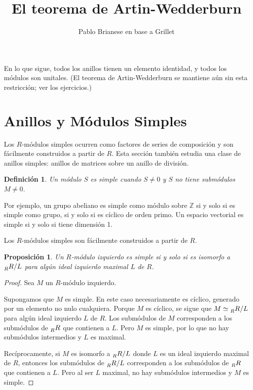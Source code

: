 \documentclass{article}
\title{El teorema de Artin-Wedderburn}
\author{Pablo Brianese en base a Grillet}
\newtheorem{definition}{Definición}[section]
\newtheorem{proposition}{Proposición}[section]
\newcommand{\RAsRModule}{\prescript{}{R}{R}}
\begin{document}
\maketitle


En lo que sigue, todos los anillos tienen un elemento identidad, y todos los módulos son unitales.
(El teorema de Artin-Wedderburn se mantiene aún sin esta restricción; ver los ejercicios.)

\section{Anillos y Módulos Simples}

Los $R$-módulos simples ocurren como factores de series de composición y son fácilmente construidos a partir de $R$.
Esta sección también estudia una clase de anillos simples: anillos de matrices sobre un anillo de división.

\begin{definition}
    Un módulo $S$ es simple cuando $S \neq 0$ y $S$ no tiene submódulos $M \neq 0$.
\end{definition}

Por ejemplo, un grupo abeliano es simple como módulo sobre $\mathbb{Z}$ si y solo si es simple como grupo, si y solo si es cíclico de orden primo.
Un espacio vectorial es simple si y solo si tiene dimensión 1.

Los $R$-módulos simples son fácilmente construidos a partir de $R$.

\begin{proposition}
    Un $R$-módulo izquierdo es simple si y solo si es isomorfo a $\RAsRModule / L$ para algún ideal izquierdo maximal $L$ de $R$.
\end{proposition}

\begin{proof}
    Sea $M$ un $R$-módulo izquierdo.

    Supongamos que $M$ es simple.
    En este caso necesariamente es cíclico, generado por un elemento no nulo cualquiera.
    Porque $M$ es cíclico, se sigue que $M \simeq \RAsRModule / L$ para algún ideal izquierdo $L$ de $R$.
    Los submódulos de $M$ corresponden a los submódulos de $\RAsRModule$ que contienen a $L$.
    Pero $M$ es simple, por lo que no hay submódulos intermedios y $L$ es maximal.

    Recíprocamente, si $M$ es isomorfo a $\RAsRModule / L$ donde $L$ es un ideal izquierdo maximal de $R$, entonces los submódulos de $\RAsRModule / L$ corresponden a los submódulos de $\RAsRModule$ que contienen a $L$.
    Pero al ser $L$ maximal, no hay submódulos intermedios y $M$ es simple.
\end{proof}
\end{document}
